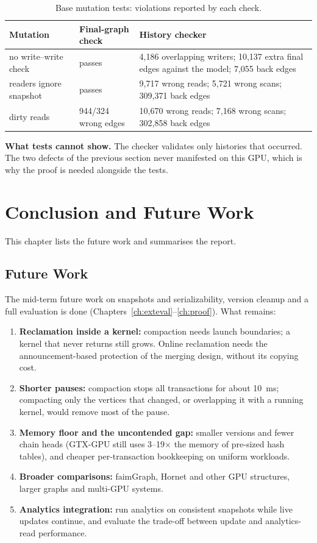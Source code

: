 \documentclass[11pt,a4paper,oneside]{report}
\newcommand{\sys}{GTX-GPU}
\begin{document}
\begin{table}[H]
\caption{Base mutation tests: violations reported by each check.}
\label{tab:mut}
\small
\begin{singlespace}
\begin{tabular}{@{}P{3.2cm}P{3.2cm}P{8.4cm}@{}}
\toprule
Mutation & Final-graph check & History checker \\
\midrule
no write--write check & passes & 4,186 overlapping writers; 10,137 extra final edges against the model; 7,055 back edges \\
readers ignore snapshot & passes & 9,717 wrong reads; 5,721 wrong scans; 309,371 back edges \\
dirty reads & 944/324 wrong edges & 10,670 wrong reads; 7,168 wrong scans; 302,858 back edges \\
\bottomrule
\end{tabular}
\end{singlespace}
\end{table}

\textbf{What tests cannot show.} The checker validates only histories that occurred. The two defects of the previous
section never manifested on this GPU, which is why the proof is needed alongside the tests.

\chapter{Conclusion and Future Work}
\label{ch:conclusion}
This chapter lists the future work and summarises the report.

\section{Future Work}
The mid-term future work on snapshots and serializability, version cleanup and a full evaluation is done
(Chapters~\ref{ch:exteval}--\ref{ch:proof}). What remains:
\begin{enumerate}
\item \textbf{Reclamation inside a kernel:} compaction needs launch boundaries; a kernel that never returns still
  grows. Online reclamation needs the announcement-based protection of the merging design, without its copying cost.
\item \textbf{Shorter pauses:} compaction stops all transactions for about 10~ms; compacting only the vertices that
  changed, or overlapping it with a running kernel, would remove most of the pause.
\item \textbf{Memory floor and the uncontended gap:} smaller versions and fewer chain heads (\sys{} still uses 3--19$\times$
  the memory of pre-sized hash tables), and cheaper per-transaction bookkeeping on uniform workloads.
\item \textbf{Broader comparisons:} faimGraph, Hornet and other GPU structures, larger graphs and multi-GPU systems.
\item \textbf{Analytics integration:} run analytics on consistent snapshots while live updates continue, and evaluate
  the trade-off between update and analytics-read performance.
\end{enumerate}
\end{document}
